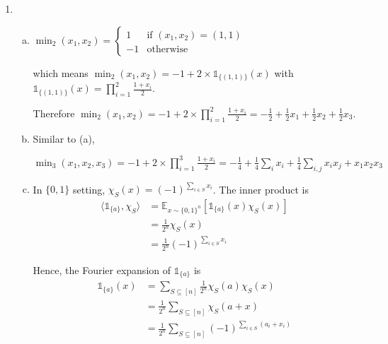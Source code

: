 \documentclass[11pt]{article}
\numberwithin{equation}{section}
\theoremstyle{definition}
\newcommand{\innerproduct}[2]{\langle #1, #2 \rangle}
\begin{document}
\begin{enumerate}
	\item
	\begin{enumerate}[(a)]
		\item\label{\thesection.1(a)} $\min_2(x_1, x_2) =
			\begin{cases}
				1 & \text{if } (x_1, x_2) = (1, 1) \\
				-1 & \text{otherwise}
			\end{cases}$
			
			which means $\min_2(x_1, x_2) = -1 + 2 \times \mathds{1}_{\{(1, 1)\}}(x)$
			with $\mathds{1}_{\{(1, 1)\}}(x) = \prod_{i=1}^2 \frac{1+x_i}{2}$. 
			
			Therefore $\min_2(x_1, x_2) = -1 + 2 \times \prod_{i=1}^2 \frac{1+x_i}{2} = -\frac{1}{2} + \frac{1}{2} x_1 + \frac{1}{2} x_2 + \frac{1}{2} x_3$.

		\item Similar to (a), 
		
		$\min_3(x_1, x_2, x_3) = -1 + 2 \times \prod_{i=1}^3 \frac{1+x_i}{2} = -\frac{1}{4} + \frac{1}{4}\sum_i x_i + \frac{1}{4} \sum_{i, j} x_i x_j + x_1 x_2 x_3$

		\item In $\{ 0, 1 \}$ setting, $\chi_S(x) = (-1)^{\sum_{i \in S} x_i}$. The inner product is 
		\begin{align*}
			\innerproduct{\mathds{1}_{\{a\}}}{\chi_S} 
			&= \mathds{E}_{x \sim \{0, 1\}^n} \left[ \mathds{1}_{\{a\}}(x) \chi_S(x) \right] \\
			&= \frac{1}{2^n} \chi_S (x) \\
			&= \frac{1}{2^n} (-1)^{\sum_{i \in S} x_i}
		\end{align*}

		Hence, the Fourier expansion of $\mathds{1}_{\{a\}}$ is
		\begin{align*}
			\mathds{1}_{\{a\}}(x) 
			&= \sum_{S \subseteq [n]} \frac{1}{2^n} \chi_S(a)\chi_S(x) \\
			&= \frac{1}{2^n} \sum_{S \subseteq [n]} \chi_S(a+x) \\
			&= \frac{1}{2^n} \sum_{S \subseteq [n]} (-1)^{\sum_{i \in S} (a_i + x_i)}
		\end{align*}


\end{enumerate}
\end{enumerate}
\end{document}
